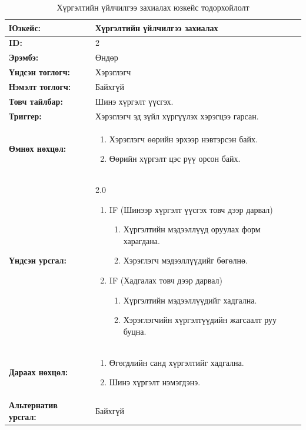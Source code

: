 \begin{table}[H]
    \caption{Хүргэлтийн үйлчилгээ захиалах юзкейс тодорхойлолт}
    \begin{tabular}{|l|p{9cm}|}
		\hline
		{\bfseries Юзкейс:} & Хүргэлтийн үйлчилгээ захиалах \\\hline
		{\bfseries ID:} & 2 \\\hline
		{\bfseries Эрэмбэ:} & Өндөр \\\hline
		{\bfseries Үндсэн тоглогч:} & Хэрэглэгч \\\hline
		{\bfseries Нэмэлт тоглогч:} & Байхгүй \\\hline
		{\bfseries Товч тайлбар:} & Шинэ хүргэлт үүсгэх. \\\hline
		{\bfseries Триггер:} & Хэрэглэгч эд зүйл хүргүүлэх хэрэгцээ гарсан. \\\hline
		{\bfseries Өмнөх нөхцөл:} &
		    \begin{enumerate}[nosep]
		        \item Хэрэглэгч өөрийн эрхээр нэвтэрсэн байх.
		        \item Өөрийн хүргэлт цэс рүү орсон байх.
		    \end{enumerate}
		\\\hline
		{\bfseries Үндсэн урсгал:} &
			2.0
			\begin{enumerate}[nosep]
				\item IF (Шинээр хүргэлт үүсгэх товч дээр дарвал)
				    \begin{enumerate}[nosep]
				        \item Хүргэлтийн мэдээллүүд оруулах форм харагдана.
				        \item Хэрэглэгч мэдээллүүдийг бөгөлнө.
				    \end{enumerate}
				\item IF (Хадгалах товч дээр дарвал)
				    \begin{enumerate}[nosep]
				        \item Хүргэлтийн мэдээллүүдийг хадгална.
				        \item Хэрэглэгчийн хүргэлтүүдийн жагсаалт руу буцна.
				    \end{enumerate}
			\end{enumerate}
		\\\hline
		{\bfseries Дараах нөхцөл:} &
		    \begin{enumerate}[nosep]
		        \item Өгөгдлийн санд хүргэлтийг хадгална.
		        \item Шинэ хүргэлт нэмэгдэнэ.
		    \end{enumerate}
		\\\hline
		{\bfseries Альтернатив урсгал:} & Байхгүй
		\\\hline
    \end{tabular}
\end{table}

